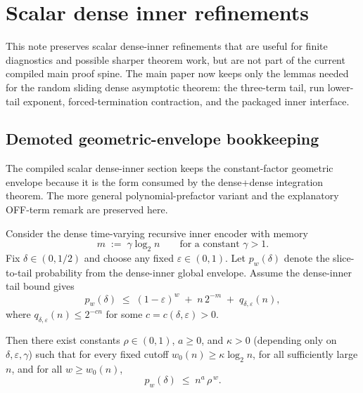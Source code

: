 \section{Scalar dense inner refinements}
\label{sec:scalar-dense-inner-refinements}

This note preserves scalar dense-inner refinements that are useful for finite diagnostics and possible sharper theorem
work, but are not part of the current compiled main proof spine. The main paper now keeps only the lemmas needed for the
random sliding dense asymptotic theorem: the three-term tail, run lower-tail exponent, forced-termination contraction,
and the packaged inner interface.

\subsection{Demoted geometric-envelope bookkeeping}

The compiled scalar dense-inner section keeps the constant-factor geometric envelope because it is the form consumed by
the dense+dense integration theorem.  The more general polynomial-prefactor variant and the explanatory OFF-term remark
are preserved here.

\begin{corollary}
\label{cor:dense-inner-geometric-cutoff}
Consider the dense time-varying recursive inner encoder with memory
\[
m \;:=\; \gamma \log_2 n
\qquad\text{for a constant }\gamma>1.
\]
Fix $\delta\in(0,1/2)$ and choose any fixed $\varepsilon\in(0,1)$.
Let $p_w(\delta)$ denote the slice-to-tail probability from the dense-inner global envelope.
Assume the dense-inner tail bound gives
\begin{equation}
\label{eq:dense-three-term-recall}
p_w(\delta)
\;\le\;
(1-\varepsilon)^w \;+\; n\,2^{-m} \;+\; q_{\delta,\varepsilon}(n),
\end{equation}
where $q_{\delta,\varepsilon}(n)\le 2^{-c n}$ for some $c=c(\delta,\varepsilon)>0$.

Then there exist constants $\rho\in(0,1)$, $a\ge 0$, and $\kappa>0$
(depending only on $\delta,\varepsilon,\gamma$) such that
for every fixed cutoff $w_0(n)\ge \kappa\log_2 n$,
for all sufficiently large $n$, and for all $w\ge w_0(n)$,
\[
p_w(\delta)\;\le\; n^{a}\,\rho^{\,w}.
\]
\end{corollary}

